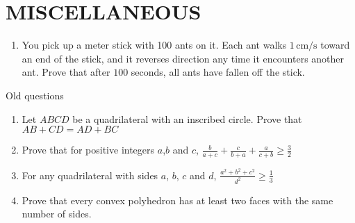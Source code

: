 \documentclass[12pt]{article}
\begin{document}
\section{MISCELLANEOUS}
\begin{enumerate}
\item You pick up a meter stick with 100 ants on it. Each ant walks \(1 \, \text{cm/s}\) toward an end of the stick, and it reverses direction any time it encounters another ant. Prove that after \(100\) seconds, all ants have fallen off the stick.

\end{enumerate}
Old questions
    
\begin{enumerate}
    \item Let $ABCD$ be a quadrilateral with an inscribed circle. Prove that $AB+CD=AD+BC$
    \item Prove that for positive integers $a$,$b$ and $c$, $\frac{b}{a+c} + \frac{c}{b+a} + \frac{a}{c+b} \geq \frac{3}{2}$
    \item For any quadrilateral with sides $a$, $b$, $c$ and $d$, $\frac{a^{2}+b^{2}+c^{2}}{d^{2}} \geq \frac{1}{3}$
    \item Prove that every convex polyhedron has at least two faces with the same number of sides.

\end{enumerate}
\pagebreak
\end{document}
